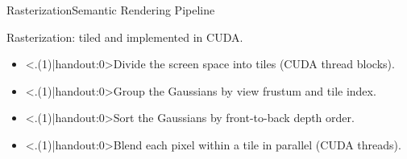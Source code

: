 \begin{frame}



	\begin{block}{Rasterization\hfill Semantic Rendering Pipeline }
		\par \alert{Rasterization}: tiled and implemented in CUDA.
		\begin{itemize}[<+(1)->]
			\mode<presentation>{\setlength{\itemsep}{1.5ex}}
			\item \alert<.(1)|handout:0>{Divide} the screen space into tiles (CUDA thread blocks).
			\item \alert<.(1)|handout:0>{Group} the Gaussians by view frustum and tile index.
			\item \alert<.(1)|handout:0>{Sort} the Gaussians by front-to-back depth order.
			\item \alert<.(1)|handout:0>{Blend} each pixel within a tile in parallel (CUDA threads).
		\end{itemize}
	\end{block}
\end{frame}

